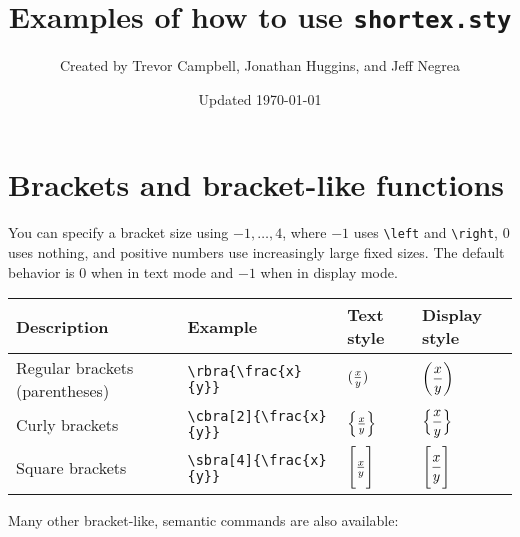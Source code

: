 \documentclass{article}
\title{Examples of how to use \texttt{shortex.sty}}
\author{Created by Trevor Campbell, Jonathan Huggins, and Jeff Negrea}
\date{Updated \today}
\begin{document}
\maketitle

\section{Brackets and bracket-like functions}

You can specify a bracket size using $-1,\dots,4$, where $-1$ uses \verb!\left! and \verb!\right!, 
$0$ uses nothing, and positive numbers use increasingly large fixed sizes. 
The default behavior is $0$ when in text mode
and $-1$ when in display mode.

\begin{center}
\begin{tabular}{@{}llll@{}}
\toprule
Description 				& Example					& Text style 				& Display style \\ \midrule
Regular brackets (parentheses)	& \verb!\rbra{\frac{x}{y}}!        	& $\rbra{\frac{x}{y}}$ 		& $\displaystyle\rbra{\frac{x}{y}}$ \\[10pt]
Curly brackets 			& \verb!\cbra[2]{\frac{x}{y}}!    	& $\cbra[2]{\frac{x}{y}}$ 	& $\displaystyle\cbra[2]{\frac{x}{y}}$ \\[10pt]
Square brackets 			& \verb!\sbra[4]{\frac{x}{y}}!        	& $\sbra[4]{\frac{x}{y}}$ 	& $\displaystyle\sbra[4]{\frac{x}{y}}$ \\[10pt]
\bottomrule
\end{tabular}
\end{center}

Many other bracket-like, semantic commands are also available:
\end{document}
